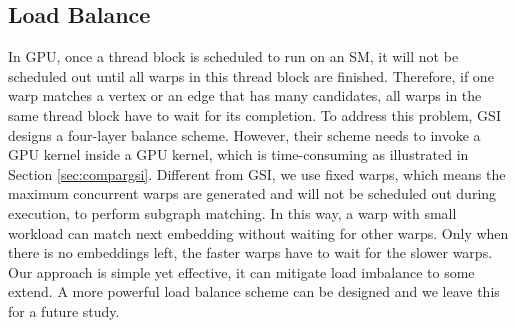 \subsection{Load Balance}
In GPU, once a thread block is scheduled to run on an SM, it will not be scheduled out until all warps in this thread block are finished. Therefore, if one warp matches a vertex or an edge that has many candidates, all warps in the same thread block have to wait for its completion. To address this problem, GSI designs a four-layer balance scheme. However, their scheme needs to invoke a GPU kernel inside a GPU kernel, which is time-consuming as illustrated in Section \ref{sec:compargsi}. Different from GSI, we use fixed warps, which means the maximum concurrent warps are generated and will not be scheduled out during execution, to perform subgraph matching. In this way, a warp with small workload can match next embedding without waiting for other warps. Only when there is no embeddings left, the faster warps have to wait for the slower warps. Our approach is simple yet effective, it can mitigate load imbalance to some extend. A more powerful load balance scheme can be designed and we leave this for a future study.
